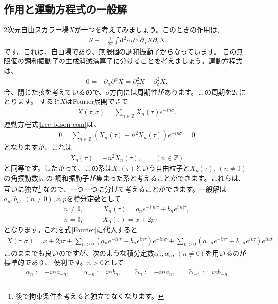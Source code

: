 \documentclass[report,paper=a4, fontsize=12pt, line_length=16cm, number_of_lines=34,dvipdfmx]{jlreq}
\numberwithin{equation}{chapter}
\numberwithin{equation}{section}
\newcommand{\Zb}{\mathbb{Z}}
\newcommand{\del}{\partial}
\newcommand{\alphat}{\tilde{\alpha}}
\newcommand{\di}{\mathrm{d}}
\begin{document}
\subsection{作用と運動方程式の一般解}
2次元自由スカラー場$X$が一つを考えてみましょう。このときの作用は、
\begin{align}
S=-\frac{1}{8\pi}\int \di^2\sigma \eta^{\alpha\beta}\del_{\alpha} X \del_{\beta} X
\label{free-boson-action}
\end{align}
です。これは、自由場であり、無限個の調和振動子からなっています。
この無限個の調和振動子の生成消滅演算子に分けることを考えましょう。運動方程式は、
\begin{align}
0=-\del_{\alpha}\del^{\alpha}X=\del_{\tau}^2 X-\del_{\sigma}^2 X.
\label{free-boson-eom}
\end{align}
今、閉じた弦を考えているので、$\sigma$方向には周期性があります。この周期を$2\pi$にとります。
すると$X$はFourier展開できて
\begin{align}
  X(\tau,\sigma)=\sum_{n\in \Zb} X_n(\tau)e^{-in\sigma}. \label{Fourier}
\end{align}
運動方程式\eqref{free-boson-eom}は、
\begin{align}
  0=\sum_{n\in \Zb} (\ddot{X}_{n}(\tau)+n^2 X_{n}(\tau))e^{-in\sigma}=0
\end{align}
となりますが、これは
\begin{align}
\ddot{X}_n(\tau)=-n^2 X_n(\tau),\qquad (n\in \Zb)
\end{align}
と同等です。したがって、この系は$X_0(\tau)$という自由粒子と$X_{n}(\tau),\ (n\ne 0)$ の角振動数$|n|$の
調和振動子が集まった系と考えることができます。これらは、互いに独立\footnote{後で拘束条件を考えると独立でなくなります。}
なので、一つ一つに分けて考えることができます。一般解は$a_n, b_n, \ (n\ne0),x, p$を積分定数として
\begin{align}
n\ne 0,\qquad & X_{n}(\tau)=a_n e^{-i|n|\tau}+b_n e^{i|n|\tau},\\
n = 0,\qquad & X_{0}(\tau)=x+2p\tau
\end{align}
となります。これを式\eqref{Fourier}に代入すると
\begin{align}
X(\tau,\sigma)=
x+2p\tau
+\sum_{n>0} (a_ne^{-in\tau}+b_n e^{in\tau})e^{-in\sigma}
+\sum_{n>0} (a_{-n}e^{-in\tau}+b_{-n}e^{in\tau})e^{in\sigma}.
\end{align}
このままでも良いのですが、次のような積分定数$\alpha_n,\alphat_n,\ (n\ne 0)$を用いるのが標準的であり、
便利です。$n>0$として
\begin{align}
\alpha_n:=-i n a_{-n},\qquad \alpha_{-n}:=i n b_{n},\qquad
\alphat_n:=-i n a_n,\qquad \alphat_{-n}:=i n b_{-n}
\end{align}
\end{document}
